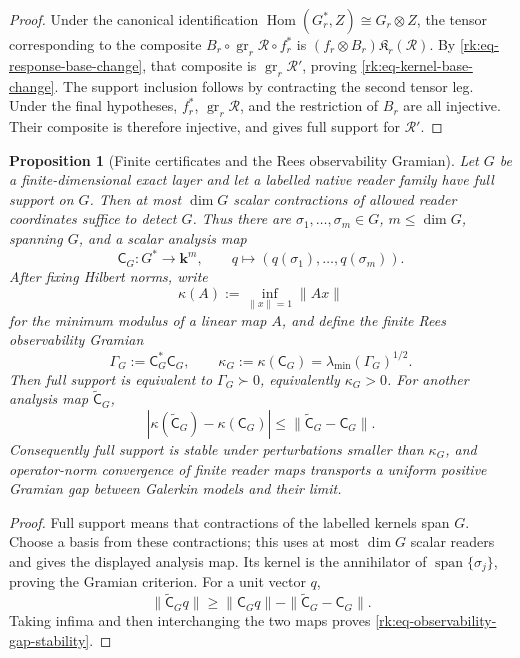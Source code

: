 \documentclass[10pt,reqno]{amsart}
\theoremstyle{plain}
\newtheorem{proposition}[theorem]{Proposition}
\theoremstyle{definition}
\theoremstyle{remark}
\begin{document}
\begin{proof}
Under the canonical identification
$\operatorname{Hom}(G_r^*,Z)\cong G_r\otimes Z$, the tensor corresponding
to the composite
$B_r\circ\operatorname{gr}_r\mathcal R\circ f_r^*$ is
$(f_r\otimes B_r)\mathfrak K_r(\mathcal R)$.  By
\eqref{rk:eq-response-base-change}, that composite is
$\operatorname{gr}_r\mathcal R'$, proving
\eqref{rk:eq-kernel-base-change}.  The support inclusion follows by
contracting the second tensor leg.  Under the final hypotheses,
$f_r^*$, $\operatorname{gr}_r\mathcal R$, and the restriction of $B_r$
are all injective.  Their composite is therefore injective, and
 gives full support for $\mathcal R'$.
\end{proof}

\begin{proposition}[Finite certificates and the Rees observability Gramian]
\label{rk:prop-robust-support}
Let $G$ be a finite-dimensional exact layer and let a labelled native reader
family have full support on $G$.  Then at most $\dim G$ scalar contractions of
allowed reader coordinates suffice to detect $G$.  Thus there are
$\sigma_1,\ldots,\sigma_m\in G$, $m\leq\dim G$, spanning $G$, and a scalar
analysis map
\[
 \mathsf C_G:G^*\longrightarrow\mathbf k^m,
 \qquad q\longmapsto(q(\sigma_1),\ldots,q(\sigma_m)).
\]
After fixing Hilbert norms, write
\[
 \kappa(A):=\inf_{\|x\|=1}\|Ax\|
\]
for the minimum modulus of a linear map $A$, and define the finite Rees
observability Gramian
\begin{equation}
 \Gamma_G:=\mathsf C_G^*\mathsf C_G,
 \qquad
 \kappa_G:=\kappa(\mathsf C_G)
 =\lambda_{\min}(\Gamma_G)^{1/2}.
 \label{rk:eq-rees-observability-gramian}
\end{equation}
Then full support is equivalent to $\Gamma_G\succ0$, equivalently
$\kappa_G>0$.  For another analysis map $\widetilde{\mathsf C}_G$,
\begin{equation}
 |\kappa(\widetilde{\mathsf C}_G)-\kappa(\mathsf C_G)|
 \leq\|\widetilde{\mathsf C}_G-\mathsf C_G\|.
 \label{rk:eq-observability-gap-stability}
\end{equation}
Consequently full support is stable under perturbations smaller than
$\kappa_G$, and operator-norm convergence of finite reader maps transports a
uniform positive Gramian gap between Galerkin models and their limit.
\end{proposition}

\begin{proof}
Full support means that contractions of the labelled kernels span $G$.
Choose a basis from these contractions; this uses at most $\dim G$ scalar
readers and gives the displayed analysis map.  Its kernel is the annihilator
of $\operatorname{span}\{\sigma_j\}$, proving the Gramian criterion.  For a
unit vector $q$,
\[
 \|\widetilde{\mathsf C}_Gq\|
 \geq\|\mathsf C_Gq\|-\|\widetilde{\mathsf C}_G-\mathsf C_G\|.
\]
Taking infima and then interchanging the two maps proves
\eqref{rk:eq-observability-gap-stability}.
\end{proof}
\end{document}
